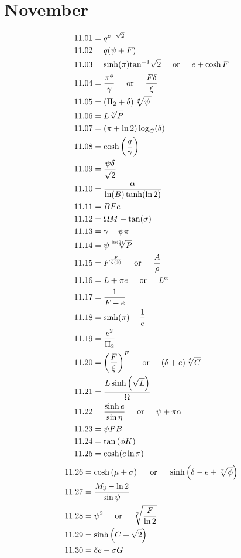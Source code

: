 \documentclass[12pt]{article}
\newcommand{\atan}{\text{tan}^{-1}}
\newcommand{\oder}{\hspace{5mm}\text{or}\hspace{5mm}}
\begin{document}
\pagebreak
 
\section{November}
\begin{align*}
11.01 &= q^{e + \sqrt{2}}\\
11.02 &= q (\psi + F)\\
11.03 &= \sinh(\pi)\atan\sqrt{2} \oder e+\cosh{F}\\
11.04 &= \frac{\pi^{\phi}}{\gamma} \oder \frac{F \delta}{\xi}\\
11.05 &= \left(\Pi_{2} + \delta\right) \sqrt[\sigma]{\psi\,}\\
11.06 &= L \sqrt[\gamma]{P}\\
11.07 &= (\pi+\ln 2)\log_{C}(\delta)\\
11.08 &= \cosh\left(\frac{q}{\gamma}\right)\\
11.09 &= \frac{\psi \delta}{\sqrt{2}}\\
11.10 &= \frac{\alpha}{\ln(B)\tanh(\ln 2)}\\
11.11 &= BFe\\
11.12 &= \Omega M-\tan(\sigma)\\
11.13 &= \gamma+\psi \pi\\
11.14 &= \psi \sqrt[\ln(2)]{P}\\
11.15 &= F^{\frac{F}{\zeta(3)}} \oder \frac{A}{\rho}\\
11.16 &= L + \pi e \oder L^{\alpha}\\
11.17 &= \frac{1}{F-e}\\
11.18 &= \sinh(\pi)-\frac{1}{e}\\
11.19 &= \frac{e^{2}}{\Pi_{2}}\\
11.20 &= \left(\frac{F}{\xi}\right)^{F} \oder (\delta+e)\sqrt[A]{C} \\
11.21 &= \frac{L \sinh\left(\sqrt{L}\right)}{\Omega}\\
11.22 &= \frac{\sinh e}{\sin\eta} \oder \psi + \pi\alpha\\
11.23 &= \psi P B\\
11.24 &= \tan\left(\phi K\right)\\
11.25 &= \cosh(e \ln \pi)\\
\end{align*}
\begin{align*}
11.26 &= \cosh\left(\mu+\sigma\right) \oder \sinh\left(\delta - e + \sqrt[\pi]{\phi}\right) \\
11.27 &= \frac{M_{3}-\ln 2}{\sin\psi}\\
11.28 &= \psi^{2} \oder \sqrt[\gamma]{\frac{F}{\ln 2}}\\
11.29 &= \sinh\left(C+\sqrt{2}\right)\\
11.30 &= \delta e-\sigma G\\
\end{align*}
\end{document}
